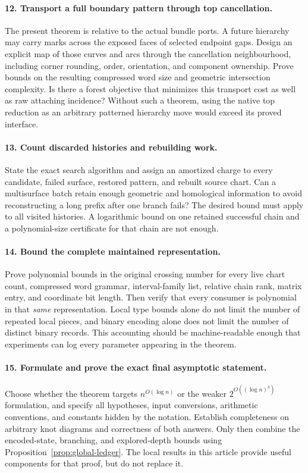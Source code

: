 \paragraph{12. Transport a full boundary pattern through top cancellation.}
The present theorem is relative to the actual bundle ports. A future
hierarchy may carry marks across the exposed faces of selected endpoint
gaps. Design an explicit map of those curves and arcs through the
cancellation neighbourhood, including corner rounding, order, orientation,
and component ownership. Prove bounds on the resulting compressed word
size and geometric intersection complexity. Is there a forest objective
that minimizes this transport cost as well as raw attaching incidence?
Without such a theorem, using the native top reduction as an arbitrary
patterned hierarchy move would exceed its proved interface.

\paragraph{13. Count discarded histories and rebuilding work.}
State the exact search algorithm and assign an amortized charge to every
candidate, failed surface, restored pattern, and rebuilt source chart.
Can a multisurface batch retain enough geometric and homological information
to avoid reconstructing a long prefix after one branch fails? The desired
bound must apply to all visited histories. A logarithmic bound on one
retained successful chain and a polynomial-size certificate for that chain
are not enough.

\paragraph{14. Bound the complete maintained representation.}
Prove polynomial bounds in the original crossing number for every live
chart count, compressed word grammar, interval-family list, relative chain
rank, matrix entry, and coordinate bit length. Then verify that every
consumer is polynomial in that \emph{same} representation. Local type
bounds alone do not limit the number of repeated local pieces, and binary
encoding alone does not limit the number of distinct binary records.
This accounting should be machine-readable enough that experiments can
log every parameter appearing in the theorem.

\paragraph{15. Formulate and prove the exact final asymptotic statement.}
Choose whether the theorem targets $n^{O(\log n)}$ or the weaker
$2^{O((\log n)^3)}$ formulation, and specify all hypotheses, input
conversions, arithmetic conventions, and constants hidden by the notation.
Establish completeness on arbitrary knot diagrams and correctness of both
answers. Only then combine the encoded-state, branching, and explored-depth
bounds using Proposition~\ref{prop:global-ledger}. The local results in this
article provide useful components for that proof, but do not replace it.

